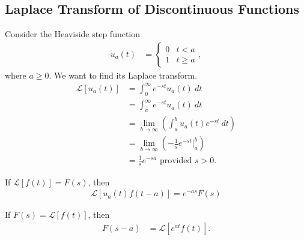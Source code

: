 \documentclass[10pt]{mypackage}
\begin{document}
\subsection{Laplace Transform of Discontinuous Functions}%
Consider the Heaviside step function
\begin{align*}
  u_{a}\left(t\right) &= \begin{cases}
    0 & t < a\\
    1 & t \geq a
  \end{cases},
\end{align*}
where $a \geq 0$. We want to find its Laplace transform.
\begin{align*}
  \mathcal{L}\left[u_a\left(t\right)\right] &= \int_{0}^{\infty} e^{-st}u_a\left(t\right)\:dt\\
                                            &= \int_{a}^{\infty} e^{-st}u_a\left(t\right)\:dt\\
                                            &= \lim_{b\rightarrow\infty}\left(\int_{a}^{b} u_a\left(t\right)e^{-st}\:dt\right)\\
                                            &= \lim_{b\rightarrow\infty}\left(-\frac{1}{s}e^{-st}\Bigr\vert_{a}^{b}\right)\\
                                            &= \frac{1}{s}e^{-sa}\text{ provided $s > 0$.}
\end{align*}
\begin{theorem}
  If $\mathcal{L}\left[f(t)\right] = F(s)$, then 
  \begin{align*}
    \mathcal{L}\left[u_a(t)f\left(t-a\right)\right] = e^{-as}F(s)
  \end{align*}
  
\end{theorem}
\begin{theorem}
  If $F(s) = \mathcal{L}\left[f(t)\right]$, then
  \begin{align*}
    F\left(s-a\right) &= \mathcal{L}\left[e^{at}f(t)\right].
  \end{align*}
  
\end{theorem}
\end{document}
